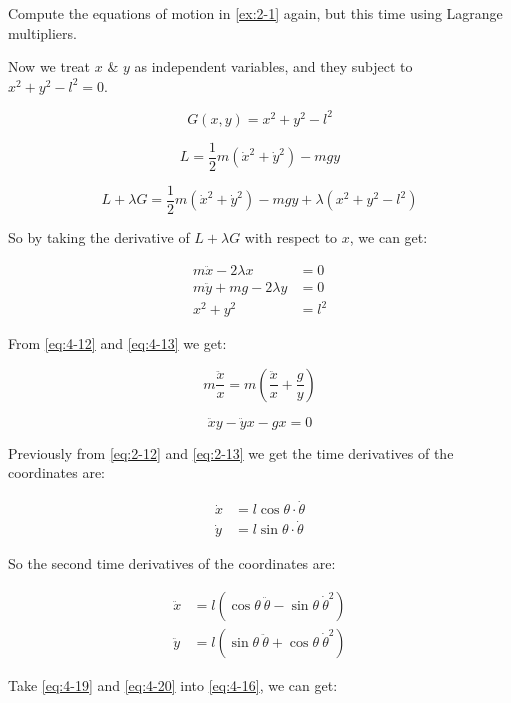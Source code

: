 \begin{example}
    Compute the equations of motion in \ref{ex:2-1} again, but this time using Lagrange
    multipliers.
\end{example}

\begin{solution}
    Now we treat $x$ \& $y$ as independent variables, and they subject to $x^2+y^2-l^2=0$.
    
    \begin{equation}
        G\left(x, y\right) = x^2 + y^2 - l^2
    \end{equation}

    \begin{equation}
        L = \frac{1}{2} m \left(\dot{x} ^ 2 + \dot{y} ^ 2\right) - mgy
    \end{equation}

    \begin{equation}
        L + \lambda G = \frac{1}{2} m \left(\dot{x} ^ 2 + \dot{y} ^ 2\right) - mgy + \lambda \left(x^2 + y^2 - l^2\right)
    \end{equation}

    So by taking the derivative of $L + \lambda G$ with respect to $x$, we can get:

    \begin{align}
        \label{eq:4-12}
        m \ddot{x} - 2 \lambda x &= 0 \\
        \label{eq:4-13}
        m \ddot{y} + mg - 2 \lambda y &= 0 \\
        x ^ 2 + y ^ 2 &= l ^ 2
    \end{align}

    From \ref{eq:4-12} and \ref{eq:4-13} we get:

    \begin{equation}
        m \frac{\ddot{x}}{x} = m \left(\frac{\ddot{x}}{x} + \frac{g}{y}\right)
    \end{equation}

    \begin{equation}
        \label{eq:4-16}
        \ddot{x} y - \ddot{y} x - gx = 0
    \end{equation}

    Previously from \ref{eq:2-12} and \ref{eq:2-13} we get the time derivatives of the 
    coordinates are:

    \begin{align}
        \dot{x} &= l \cos{\theta} \cdot \dot{\theta} \\
        \dot{y} &= l \sin{\theta} \cdot \dot{\theta} 
    \end{align}

    So the second time derivatives of the coordinates are:

    \begin{align}
        \label{eq:4-19}
        \ddot{x} &= l\left(\cos \theta \ \ddot{\theta} - \sin \theta \ \dot{\theta}^2\right) \\
        \label{eq:4-20}
        \ddot{y} &= l\left(\sin \theta \ \ddot{\theta} + \cos \theta \ \dot{\theta}^2\right)
    \end{align}

    Take \ref{eq:4-19} and \ref{eq:4-20} into \ref{eq:4-16}, we can get:
\end{solution}
